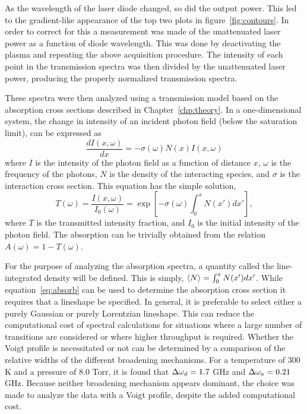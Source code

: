 As the wavelength of the laser diode changed, so did the output power. This led
to the gradient-like appearance of the top two plots in
figure~\ref{fig:contours}. In order to correct for this a measurement was made
of the unattenuated laser power as a function of diode wavelength. This was done by
deactivating the plasma and repeating the above acquisition procedure. The
intensity of each point in the transmission spectra was then divided by the
unattenuated laser power, producing the properly normalized transmission
spectra.

These spectra were then analyzed using a transmission model based on the
absorption cross sections described in Chapter~\ref{chp:theory}. In a
one-dimensional system, the change in intensity of an incident photon field
(below the saturation limit), can be expressed as
\begin{equation}
  \frac{dI(x, \omega)}{dx} = -\sigma(\omega) N(x) I(x, \omega)
\end{equation}
where $I$ is the intensity of the photon field as a function of distance $x$,
$\omega$ is the frequency of the photons, $N$ is the density of the interacting
species, and $\sigma$ is the interaction cross section. This equation has the
simple solution,
\begin{equation}
  T(\omega) = \frac{I(x, \omega)}{I_0(\omega)}
            = \exp\left[-\sigma(\omega) \int_0^x N(x') dx'\right],
  \label{eq:transmitted}
\end{equation}
where $T$ is the transmitted intensity fraction, and $I_0$ is the initial
intensity of the photon field. The absorption can be trivially obtained from the
relation $A(\omega) = 1 - T(\omega)$.

For the purpose of analyzing the absorption spectra, a quantity called the
line-integrated density will be defined. This is simply, $\langle N \rangle = \int_0^x
N(x')dx'$. While equation~\ref{eq:absorb} can be used to determine the
absorption cross section it requires that a lineshape be specified. In general,
it is preferable to select either a purely Gaussian or purely Lorentzian
lineshape. This can reduce the computational cost of spectral calculations for
situations where a large number of transitions are considered or where higher
throughput is required. Whether the Voigt profile is necessitated or not can be
determined by a comparison of the relative widths of the different broadening
mechanisms. For a temperature of 300 K and a pressure of 8.0 Torr, it is found
that $\Delta \omega_d = 1.7$ GHz and $\Delta \omega_a = 0.21$ GHz. Because neither broadening
mechanism appears dominant, the choice was made to analyze the data with a Voigt
profile, despite the added computational cost.

